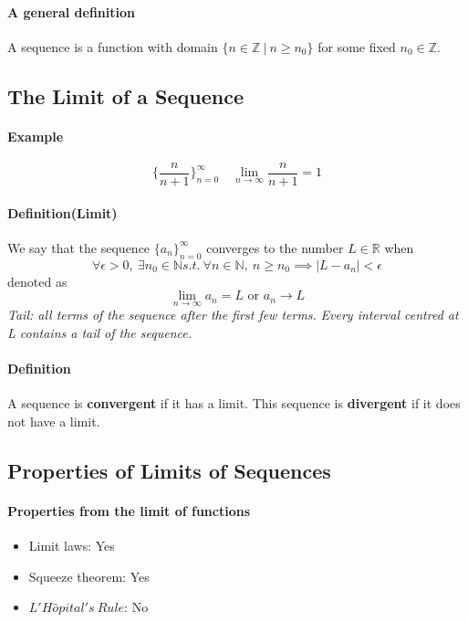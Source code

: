 \documentclass{article}
\begin{document}
\paragraph{A general definition} A sequence is a function with domain $\{n \in \mathbb{Z}\ \vert\ n \geq n _0\}$ for some fixed $n_0 \in \mathbb{Z}$.

\subsection{The Limit of a Sequence}

\paragraph{Example}
\[
	\{\frac{n}{n+1}\}_{n=0}^{\infty}\quad \lim_{n\to\infty}{\frac{n}{n+1}} = 1
\]

\paragraph{Definition(Limit)} We say that the sequence $\{a_n\}_{n=0}^{\infty}$ converges to the number $L \in \mathbb{R}$ when
\[
	\forall \epsilon > 0,\ \exists n_0 \in \mathbb{N}s.t.\ \forall n \in \mathbb{N},\ n \geq n_0 \implies \vert L - a_n\vert < \epsilon
\]
denoted as 
\[
	\lim_{n\to\infty}{a_n} = L \text{ or } a_n \to L
\]
\emph{Tail: all terms of the sequence after the first few terms.}
\newline
\emph{Every interval centred at L contains a tail of the sequence.}

\paragraph{Definition} A sequence is \textbf{convergent} if it has a limit. This sequence is \textbf{divergent} if it does not have a limit.

\subsection{Properties of Limits of Sequences}

\paragraph{Properties from the limit of functions}
\begin{itemize}
	\item Limit laws: Yes
	\item Squeeze theorem: Yes
	\item $L' H\hat{o}pital's\ Rule$: No
\end{itemize}
\end{document}
